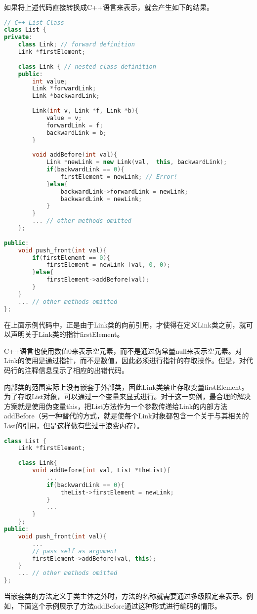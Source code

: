 如果将上述代码直接转换成C++语言来表示，就会产生如下的结果。


\begin{lstlisting}[language=C++]
// C++ List Class
class List {
private:
	class Link; // forward definition
	Link *firstElement;
	
	class Link { // nested class definition
	public:
		int value;
		Link *forwardLink;
		Link *backwardLink;
		
		Link(int v, Link *f, Link *b){
			value = v;
			forwardLink = f;
			backwardLink = b;
		}
		
		void addBefore(int val){
			Link *newLink = new Link(val,  this, backwardLink);
			if(backwardLink == 0){
				firstElement = newLink; // Error!
			}else{
				backwardLink->forwardLink = newLink;
				backwardLink = newLink;
			}
		}
		... // other methods omitted
	};
	
public:
	void push_front(int val){
		if(firstElement == 0){
			firstElement = newLink (val, 0, 0);
		}else{
			firstElement->addBefore(val);
		}
	}
	... // other methods omitted
};
\end{lstlisting}


在上面示例代码中，正是由于Link类的向前引用，才使得在定义Link类之前，就可以声明关于Link类的指针firstElement。

C++语言也使用数值0来表示空元素，而不是通过伪常量null来表示空元素。对Link的使用是通过指针，而不是数值，因此必须进行指针的存取操作。但是，对代码行的注释信息显示了相应的出错代码。

内部类的范围实际上没有嵌套于外部类，因此Link类禁止存取变量firstElement。为了存取List对象，可以通过一个变量来显式进行。对于这一实例，最合理的解决方案就是使用伪变量this，把List方法作为一个参数传递给Link的内部方法addBefore（另一种替代的方式，就是使每个Link对象都包含一个关于与其相关的List的引用，但是这样做有些过于浪费内存）。



\begin{lstlisting}[language=C++]
class List {
	Link *firstElement;
	
	class Link{
		void addBefore(int val, List *theList){
			...
			if(backwardLink == 0){
				theList->firstElement = newLink;
			}
			...
		}
	};
public:
	void push_front(int val){
		...
		// pass self as argument
		firstElement->addBefore(val, this);
	}
	... // other methods omitted
};
\end{lstlisting}

当嵌套类的方法定义于类主体之外时，方法的名称就需要通过多级限定来表示。例如，下面这个示例展示了方法addBefore通过这种形式进行编码的情形。



